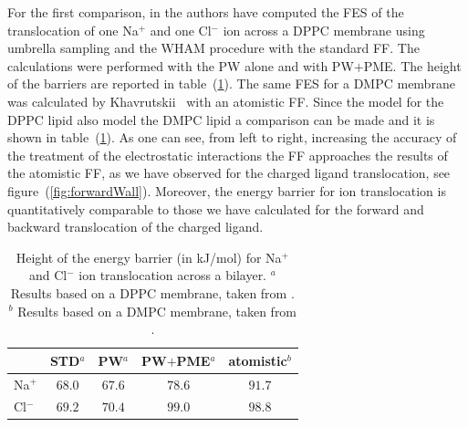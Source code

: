 For the first comparison, in \cite{PW} the authors have computed the \ac{FES} of the translocation of one Na$^+$ and one Cl$^-$ ion across a \acs{DPPC} membrane using umbrella sampling and the \ac{WHAM} procedure with the standard \martini \ac{FF}. The calculations were performed with the \ac{PW} alone and with \ac{PW}$+$\ac{PME}. The height of the barriers are reported in table~(\ref{tab:ionTranslocation}). The same \ac{FES} for a \acs{DMPC} membrane was calculated by Khavrutskii \etal\, \cite{atomisticTranslocation} with an atomistic \ac{FF}. Since the \martini model for the \acs{DPPC} lipid also model the \acs{DMPC} lipid a comparison can be made and it is shown in table~(\ref{tab:ionTranslocation}). As one can see, from left to right, increasing the accuracy of the treatment of the electrostatic interactions the \martini \ac{FF} approaches the results of the atomistic \ac{FF}, as we have observed for the charged ligand translocation, see figure~(\ref{fig:forwardWall}). Moreover, the energy barrier for ion translocation is quantitatively comparable to those we have calculated for the forward and backward translocation of the charged ligand.
\begin{table}[h!t]
	\centering
	\begin{tabular}{lcccc}
		\toprule	
		\,		& STD$^a$ 	& \acs{PW}$^a$ 	& \acs{PW}$+$\acs{PME}$^a$ 	& atomistic$^b$	\\ \toprule
		Na$^+$	& $68.0$& $67.6$	& $78.6$	& $91.7$ 	\\ \midrule
		Cl$^-$	& $69.2$& $70.4$	& $99.0$	& $98.8$	\\ \bottomrule
	\end{tabular}
	\caption{Height of the energy barrier (in kJ/mol) for Na$^+$ and Cl$^-$ ion translocation across a bilayer. $^a$ Results based on a \acs{DPPC} membrane, taken from \cite{PW}. $^b$ Results based on a \acs{DMPC} membrane, taken from \cite{atomisticTranslocation}.}
	\label{tab:ionTranslocation}
\end{table}

